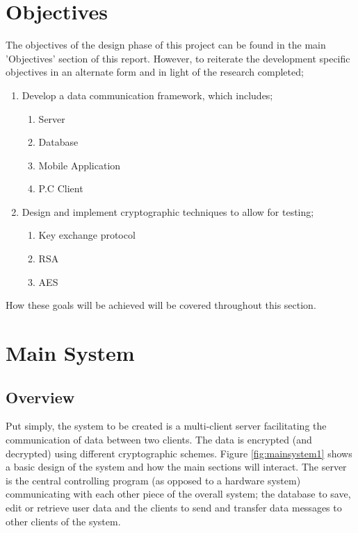 \documentclass[a4paper,12pt]{report}
\begin{document}
\section{Objectives}

The objectives of the design phase of this project can be found in the main 'Objectives' section of this report. However, to reiterate the development specific objectives in an alternate form and in light of the research completed; %

\begin{enumerate}
 \item Develop a data communication framework, which includes;

    \begin{enumerate}
      \item Server
      \item Database
      \item Mobile Application
      \item P.C Client
    \end{enumerate}

  \item Design and implement cryptographic techniques to allow for testing;

    \begin{enumerate}
      \item Key exchange protocol
      \item RSA
      \item AES
    \end{enumerate}

\end{enumerate}

How these goals will be achieved will be covered throughout this section.

\section{Main System}

\subsection{Overview}

Put simply, the system to be created is a multi-client server facilitating the communication of data between two clients. The data is encrypted (and decrypted) using different cryptographic schemes. Figure \ref{fig:mainsystem1} shows a basic design of the system and how the main sections will interact. The server is the central controlling program (as opposed to a hardware system) communicating with each other piece of the overall system; the database to save, edit or retrieve user data and the clients to send and transfer data messages to other clients of the system.
\end{document}
